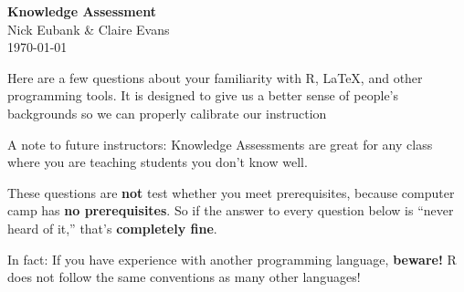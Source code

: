 \documentclass[12pt]{article}
\begin{document}
\begin{landscape}
\begin{center}
{\large \textbf{Knowledge Assessment}} \\
Nick Eubank \& Claire Evans\\
\today
\end{center}

Here are a few questions about your familiarity with R, LaTeX, and other programming tools. It is designed to give us a better sense of people's backgrounds so we can properly calibrate our instruction

A note to future instructors: Knowledge Assessments are great for any class where you are  teaching students you don't know well.

These questions are \textbf{not} test whether you meet prerequisites, because computer camp has \textbf{no prerequisites}. So if the answer to every question below is ``never heard of it,'' that's \textbf{completely fine}.

In fact: If you have experience with another programming language, \textbf{beware!} R does not follow the same conventions as many other languages!


\end{landscape}
\end{document}
